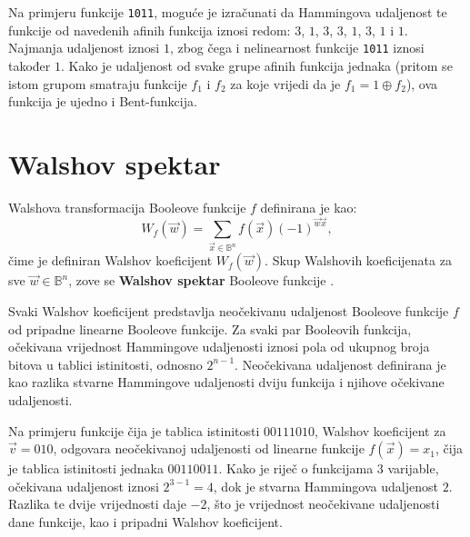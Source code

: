 Na primjeru funkcije \texttt{1011}, moguće je izračunati da Hammingova udaljenost te funkcije od navedenih afinih funkcija iznosi redom: $3$, $1$, $3$, $3$, $1$, $3$, $1$ i $1$.
Najmanja udaljenost iznosi $1$, zbog čega i nelinearnost funkcije \texttt{1011} iznosi također $1$.
Kako je udaljenost od svake grupe afinih funkcija jednaka (pritom se istom grupom smatraju funkcije $f_1$ i $f_2$ za koje vrijedi da je $f_1 = 1 \oplus f_2$), ova funkcija je ujedno i Bent-funkcija.

\section {Walshov spektar}
Walshova transformacija Booleove funkcije $f$ definirana je kao:
\begin{equation}\label{eq:walsh transform}
    W_f(\vec{w}) = \sum_{\vec{x} \in \mathds{B}^n}f(\vec{x})(-1)^{\vec{w}\vec{x}},
\end{equation}
čime je definiran Walshov koeficijent $W_f(\vec{w})$.
Skup Walshovih koeficijenata za sve $\vec{w} \in \mathds{B}^n$, zove se \textbf{Walshov spektar} Booleove funkcije \cite{CryptographicBooleanFunctions}.

Svaki Walshov koeficijent predstavlja neočekivanu udaljenost  \cite{MeasuringBoolean} Booleove funkcije $f$ od pripadne linearne Booleove funkcije.
Za svaki par Booleovih funkcija, očekivana vrijednost Hammingove udaljenosti iznosi pola od ukupnog broja bitova u tablici istinitosti, odnosno $2^{n-1}$.
Neočekivana udaljenost definirana je kao razlika stvarne Hammingove udaljenosti dviju funkcija i njihove očekivane udaljenosti.

Na primjeru funkcije čija je tablica istinitosti $00111010$, Walshov koeficijent za $\vec{v} = 010$, odgovara neočekivanoj udaljenosti od linearne funkcije $f(\vec{x}) = x_1$, čija je tablica istinitosti jednaka $00110011$.
Kako je riječ o funkcijama $3$ varijable, očekivana udaljenost iznosi $2^{3-1} = 4$, dok je stvarna Hammingova udaljenost $2$.
Razlika te dvije vrijednosti daje $-2$, što je vrijednost neočekivane udaljenosti dane funkcije, kao i pripadni Walshov koeficijent.

